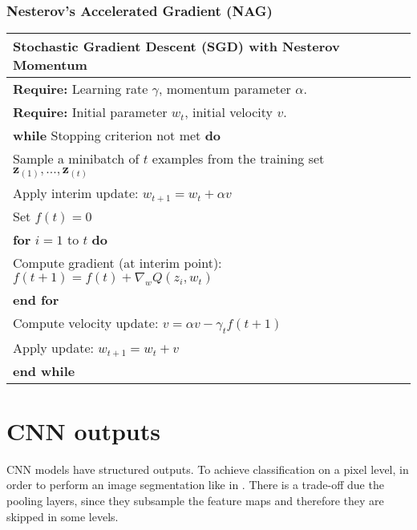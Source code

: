 \subsubsection{Nesterov's Accelerated Gradient (NAG)}
\label{subsub:NAG}
\begin{center}
\begin{tabular}{| l |}
\hline
\textbf{Stochastic Gradient Descent (SGD) with Nesterov Momentum}\\
\hline
\textbf{Require:} Learning rate $\gamma$, momentum parameter $\alpha$.\\
\textbf{Require:} Initial parameter $w_t$, initial velocity $v$.\\
\hspace{1cm} \textbf{while} Stopping criterion not met \textbf{do}\\
\hspace{2cm} Sample a minibatch of $t$ examples from the training set $\textbf{z}_{(1)} ,...,        \textbf{z}_{(t)}$ \\
\hspace{2cm} Apply interim update: \textbf{$w_{t+1} = w_t + \alpha v$}\\
\hspace{2cm} Set \textbf{$f(t) = 0$}\\
\hspace{2cm} \textbf{for} $i = 1$ to $t$ \textbf{do}\\
\hspace{3cm} Compute gradient (at interim point): \textbf{$f(t+1) = f(t) + \nabla_w Q(z_i,w_t)$}\\
\hspace{2cm} \textbf{end for}\\
\hspace{2cm} Compute velocity update: \textbf{$v = \alpha v - \gamma_t f(t+1)$}\\
\hspace{2cm} Apply update: \textbf{$w_{t+1} = w_t + v$}\\
\hspace{1cm} \textbf{end while}\\
\hline
\end{tabular}
\end{center}

\textcite{nesterov1983method} \textcite{sutskever2013importance}


\section{CNN outputs}
CNN models have structured outputs.
To achieve classification on a pixel level, in order to perform an image segmentation like in \textcite{farabet2013pami}. There is a trade-off due the pooling layers, since they subsample the feature maps and therefore they are skipped in some levels.

